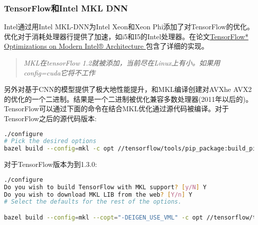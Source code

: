 \subsubsection{TensorFlow和Intel MKL DNN}
Intel通过用Intel MKL-DNN为Intel Xeon和Xeon Phi添加了对TensorFlow的优化。优化对于消耗处理器行提供了加速，如i5和I5的Intel处理器。在论文\href{https://software.intel.com/en-us/articles/tensorflow-optimizations-on-modern-intel-architecture}{TensorFlow* Optimizations on Modern Intel® Architecture }包含了详细的实现。
\begin{quote}
\emph{MKL在tensorFlow 1.2就被添加，当前尽在Linux上有小。如果用config=cuda它将不工作}
\end{quote}
另外对基于CNN的模型提供了极大地性能提升，和MKL编译创建对AVXhe AVX2的优化的一个二进制。结果是一个二进制被优化兼容多数处理器(2011年以后的)。
TensorFlow可以通过下面的命令在结合MKL优化通过源代码被编译。对于TensorFlow之后的源代码版本:
\begin{lstlisting}[language=Bash]
./configure
# Pick the desired options
bazel build --config=mkl -c opt //tensorflow/tools/pip_package:build_pip_package
\end{lstlisting}
对于TensorFlow版本为到1.3.0:
\begin{lstlisting}[language=Bash]
./configure
Do you wish to build TensorFlow with MKL support? [y/N] Y
Do you wish to download MKL LIB from the web? [Y/n] Y
# Select the defaults for the rest of the options.

bazel build --config=mkl --copt="-DEIGEN_USE_VML" -c opt //tensorflow/tools/pip_package:build_pip_package

\end{lstlisting}
